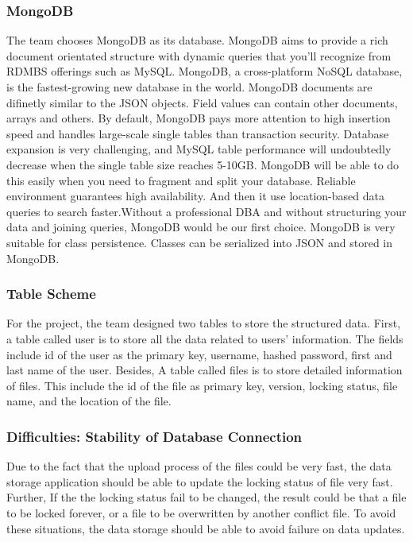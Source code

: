 \documentclass{article}
\begin{document}
\subsubsection{MongoDB}

The team chooses MongoDB as its database. MongoDB aims to provide a rich document orientated structure with dynamic queries that you'll recognize from RDMBS offerings such as MySQL. MongoDB, a cross-platform NoSQL database, is the fastest-growing new database in the world. MongoDB documents are difinetly similar to the JSON objects. Field values can contain other documents, arrays and others.
\cite{c10}\newline 
By default, MongoDB pays more attention to high insertion speed and handles large-scale single tables than transaction security. Database expansion is very challenging, and MySQL table performance will undoubtedly decrease when the single table size reaches 5-10GB. MongoDB will be able to do this easily when you need to fragment and split your database. Reliable environment guarantees high availability. And then it use location-based data queries to search faster.Without a professional DBA and without structuring your data and joining queries, MongoDB would be our first choice. MongoDB is very suitable for class persistence. Classes can be serialized into JSON and stored in MongoDB.


\subsubsection{Table Scheme}

For the project, the team designed two tables to store the structured data. First, a table called user is to store all the data related to users' information. The fields include id of the user as the primary key, username, hashed password, first and last name of the user. Besides, A table called files is to store detailed information of files. This include the id of the file as primary key, version, locking status, file name, and the location of the file.

\subsubsection{Difficulties: Stability of Database Connection }

Due to the fact that the upload process of the files could be very fast, the data storage application should be able to update the locking status of file very fast. Further, If the the locking status fail to be changed, the result could be that a file to be locked forever, or a file to be overwritten by another conflict file. To avoid these situations, the data storage should be able to avoid failure on data updates. 
\end{document}
